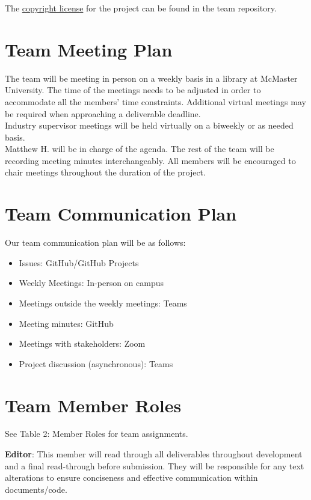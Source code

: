 \documentclass{article}
\begin{document}
The \href{https://github.com/M9Huynh/technically-functional/blob/f05da0acf59e6b8a08d67f9132471c1a17b5afef/LICENSE}{copyright license} for the project can be found in the team repository.

\section{Team Meeting Plan}

The team will be meeting in person on a weekly basis in a library at McMaster University. The time of the meetings
needs to be adjusted in order to accommodate all the members' time constraints.
Additional virtual meetings may be required when approaching a deliverable deadline.\\
Industry supervisor meetings will be held virtually on a biweekly or as needed basis. \\

Matthew H. will be in charge of the agenda. The rest of the team will be recording meeting minutes interchangeably. All members will be encouraged
to chair meetings throughout the duration of the project. 

\section{Team Communication Plan}

Our team communication plan will be as follows:
\begin{itemize}
  \item Issues: GitHub/GitHub Projects
  \item Weekly Meetings: In-person on campus
  \item Meetings outside the weekly meetings: Teams
  \item Meeting minutes: GitHub
  \item Meetings with stakeholders: Zoom
  \item Project discussion (asynchronous): Teams
\end{itemize}


\section{Team Member Roles}

See Table 2: Member Roles for team assignments.

\textbf{Editor}: This member will read through all deliverables throughout development and a final read-through before submission. They will be responsible for any
text alterations to ensure conciseness and effective communication within documents/code.
\end{document}
